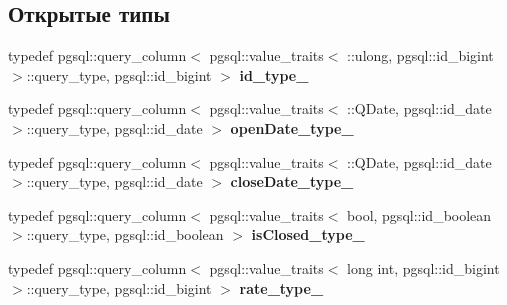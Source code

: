 \subsection*{Открытые типы}
\begin{DoxyCompactItemize}
\item 
typedef pgsql\+::query\+\_\+column$<$ pgsql\+::value\+\_\+traits$<$ \+::ulong, pgsql\+::id\+\_\+bigint $>$\+::query\+\_\+type, pgsql\+::id\+\_\+bigint $>$ {\bfseries id\+\_\+type\+\_\+}\hypertarget{structodb_1_1query__columns_3_01_1_1kpk_1_1data_1_1_loan_00_01id__pgsql_00_01_a_01_4_ac2286d8d13e074872b8761092abbbc32}{}\label{structodb_1_1query__columns_3_01_1_1kpk_1_1data_1_1_loan_00_01id__pgsql_00_01_a_01_4_ac2286d8d13e074872b8761092abbbc32}

\item 
typedef pgsql\+::query\+\_\+column$<$ pgsql\+::value\+\_\+traits$<$ \+::Q\+Date, pgsql\+::id\+\_\+date $>$\+::query\+\_\+type, pgsql\+::id\+\_\+date $>$ {\bfseries open\+Date\+\_\+type\+\_\+}\hypertarget{structodb_1_1query__columns_3_01_1_1kpk_1_1data_1_1_loan_00_01id__pgsql_00_01_a_01_4_a7266db630ab92aa1d088a5869019563c}{}\label{structodb_1_1query__columns_3_01_1_1kpk_1_1data_1_1_loan_00_01id__pgsql_00_01_a_01_4_a7266db630ab92aa1d088a5869019563c}

\item 
typedef pgsql\+::query\+\_\+column$<$ pgsql\+::value\+\_\+traits$<$ \+::Q\+Date, pgsql\+::id\+\_\+date $>$\+::query\+\_\+type, pgsql\+::id\+\_\+date $>$ {\bfseries close\+Date\+\_\+type\+\_\+}\hypertarget{structodb_1_1query__columns_3_01_1_1kpk_1_1data_1_1_loan_00_01id__pgsql_00_01_a_01_4_a4a6bc0af9ba5dd75e47273832eb7cd30}{}\label{structodb_1_1query__columns_3_01_1_1kpk_1_1data_1_1_loan_00_01id__pgsql_00_01_a_01_4_a4a6bc0af9ba5dd75e47273832eb7cd30}

\item 
typedef pgsql\+::query\+\_\+column$<$ pgsql\+::value\+\_\+traits$<$ bool, pgsql\+::id\+\_\+boolean $>$\+::query\+\_\+type, pgsql\+::id\+\_\+boolean $>$ {\bfseries is\+Closed\+\_\+type\+\_\+}\hypertarget{structodb_1_1query__columns_3_01_1_1kpk_1_1data_1_1_loan_00_01id__pgsql_00_01_a_01_4_aaaa821ef2ce62c8aaeca86e3d68f2824}{}\label{structodb_1_1query__columns_3_01_1_1kpk_1_1data_1_1_loan_00_01id__pgsql_00_01_a_01_4_aaaa821ef2ce62c8aaeca86e3d68f2824}

\item 
typedef pgsql\+::query\+\_\+column$<$ pgsql\+::value\+\_\+traits$<$ long int, pgsql\+::id\+\_\+bigint $>$\+::query\+\_\+type, pgsql\+::id\+\_\+bigint $>$ {\bfseries rate\+\_\+type\+\_\+}\hypertarget{structodb_1_1query__columns_3_01_1_1kpk_1_1data_1_1_loan_00_01id__pgsql_00_01_a_01_4_a1552e83b75d5d5dff96f99a1f6e7cb0e}{}\label{structodb_1_1query__columns_3_01_1_1kpk_1_1data_1_1_loan_00_01id__pgsql_00_01_a_01_4_a1552e83b75d5d5dff96f99a1f6e7cb0e}


\end{DoxyCompactItemize}
